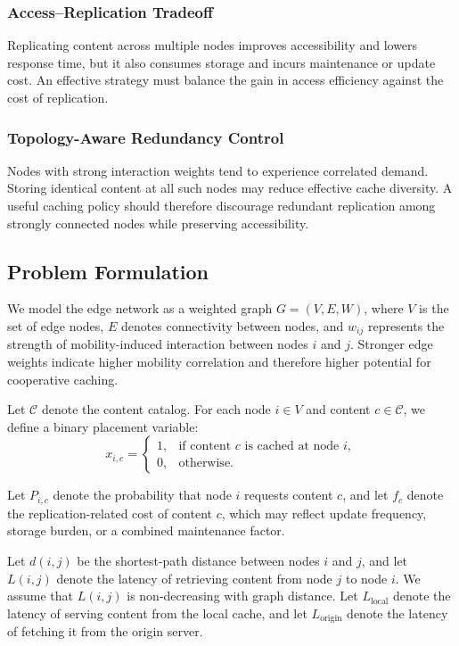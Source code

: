 \subsubsection{Access--Replication Tradeoff}
Replicating content across multiple nodes improves accessibility and lowers response time, but it also consumes storage and incurs maintenance or update cost. An effective strategy must balance the gain in access efficiency against the cost of replication.

\subsubsection{Topology-Aware Redundancy Control}
Nodes with strong interaction weights tend to experience correlated demand. Storing identical content at all such nodes may reduce effective cache diversity. A useful caching policy should therefore discourage redundant replication among strongly connected nodes while preserving accessibility.

\subsection{Problem Formulation}

We model the edge network as a weighted graph \(G = (V, E, W)\), where \(V\) is the set of edge nodes, \(E\) denotes connectivity between nodes, and \(w_{ij}\) represents the strength of mobility-induced interaction between nodes \(i\) and \(j\). Stronger edge weights indicate higher mobility correlation and therefore higher potential for cooperative caching.

Let \(\mathcal{C}\) denote the content catalog. For each node \(i \in V\) and content \(c \in \mathcal{C}\), we define a binary placement variable:
\[
x_{i,c} =
\begin{cases}
1, & \text{if content } c \text{ is cached at node } i,\\
0, & \text{otherwise.}
\end{cases}
\]

Let \(P_{i,c}\) denote the probability that node \(i\) requests content \(c\), and let \(f_c\) denote the replication-related cost of content \(c\), which may reflect update frequency, storage burden, or a combined maintenance factor.

Let \(d(i,j)\) be the shortest-path distance between nodes \(i\) and \(j\), and let \(L(i,j)\) denote the latency of retrieving content from node \(j\) to node \(i\). We assume that \(L(i,j)\) is non-decreasing with graph distance. Let \(L_{\text{local}}\) denote the latency of serving content from the local cache, and let \(L_{\text{origin}}\) denote the latency of fetching it from the origin server.

